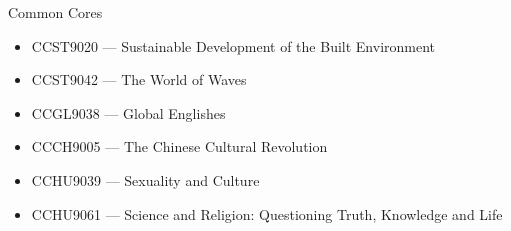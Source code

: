 Common Cores
\begin{itemize}
    \item[] CCST9020 --- Sustainable Development of the Built Environment
    \item[] CCST9042 --- The World of Waves
    \item[] CCGL9038 --- Global Englishes
    \item[] CCCH9005 --- The Chinese Cultural Revolution
    \item[] CCHU9039 --- Sexuality and Culture
    \item[] CCHU9061 --- Science and Religion: Questioning Truth, Knowledge and Life
\end{itemize}